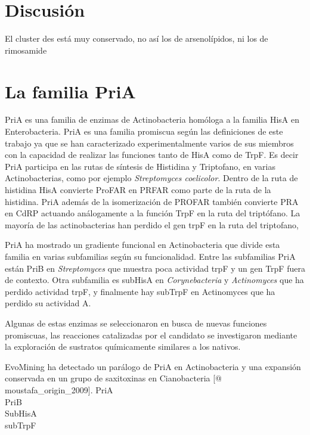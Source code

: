 \documentclass[12pt,twoside]{reedthesis}
\begin{document}
  \chapter{Discusión}\label{discusion}
  
  El cluster des está muy conservado, no así los de arsenolípidos, ni los
  de rimosamide
  
  \hypertarget{ref_labels}{\chapter{La familia PriA}\label{ref_labels}}
  
  PriA es una familia de enzimas de Actinobacteria homóloga a la familia
  HisA en Enterobacteria. PriA es una familia promiscua según las
  definiciones de este trabajo ya que se han caracterizado
  experimentalmente varios de sus miembros con la capacidad de realizar
  las funciones tanto de HisA como de TrpF. Es decir PriA participa en las
  rutas de síntesis de Histidina y Triptofano, en varias Actinobacterias,
  como por ejemplo \emph{Streptomyces coelicolor}. Dentro de la ruta de
  histidina HisA convierte ProFAR en PRFAR como parte de la ruta de la
  histidina. PriA además de la isomerización de PROFAR también convierte
  PRA en CdRP actuando análogamente a la función TrpF en la ruta del
  triptófano. La mayoría de las actinobacterias han perdido el gen trpF en
  la ruta del triptofano,
  
  PriA ha mostrado un gradiente funcional en Actinobacteria que divide
  esta familia en varias subfamilias según su funcionalidad. Entre las
  subfamilias PriA están PriB en \emph{Streptomyces} que muestra poca
  actividad trpF y un gen TrpF fuera de contexto. Otra subfamilia es
  subHisA en \emph{Corynebacteria} y \emph{Actinomyces} que ha perdido
  actividad trpF, y finalmente hay subTrpF en Actinomyces que ha perdido
  su actividad A.
  
  Algunas de estas enzimas se seleccionaron en busca de nuevas funciones
  promiscuas, las reacciones catalizadas por el candidato se investigaron
  mediante la exploración de sustratos químicamente similares a los
  nativos.
  
  EvoMining ha detectado un parálogo de PriA en Actinobacteria y una
  expansión conservada en un grupo de saxitoxinas en Cianobacteria {[}@
  moustafa\_origin\_2009{]}. PriA\\
  PriB\\
  SubHisA\\
  subTrpF\\
  \clearpage   
  
\end{document}
